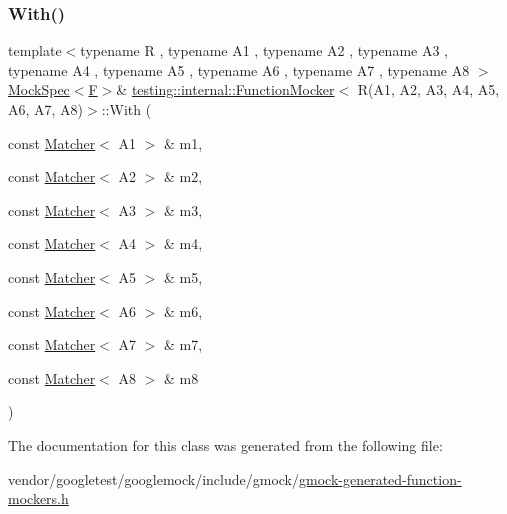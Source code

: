 \subsubsection{\texorpdfstring{With()}{With()}}
{\footnotesize\ttfamily template$<$typename R , typename A1 , typename A2 , typename A3 , typename A4 , typename A5 , typename A6 , typename A7 , typename A8 $>$ \\
\hyperlink{classtesting_1_1internal_1_1_mock_spec}{Mock\+Spec}$<$\hyperlink{classtesting_1_1internal_1_1_function_mocker_3_01_r_07_a1_00_01_a2_00_01_a3_00_01_a4_00_01_a5_00_01_a6_00_01_a7_00_01_a8_08_4_ad9749c93b0a17540778c5fa162a5fe6c}{F}$>$\& \hyperlink{classtesting_1_1internal_1_1_function_mocker}{testing\+::internal\+::\+Function\+Mocker}$<$ R(A1, A2, A3, A4, A5, A6, A7, A8)$>$\+::With (\begin{DoxyParamCaption}\item[{const \hyperlink{classtesting_1_1_matcher}{Matcher}$<$ A1 $>$ \&}]{m1,  }\item[{const \hyperlink{classtesting_1_1_matcher}{Matcher}$<$ A2 $>$ \&}]{m2,  }\item[{const \hyperlink{classtesting_1_1_matcher}{Matcher}$<$ A3 $>$ \&}]{m3,  }\item[{const \hyperlink{classtesting_1_1_matcher}{Matcher}$<$ A4 $>$ \&}]{m4,  }\item[{const \hyperlink{classtesting_1_1_matcher}{Matcher}$<$ A5 $>$ \&}]{m5,  }\item[{const \hyperlink{classtesting_1_1_matcher}{Matcher}$<$ A6 $>$ \&}]{m6,  }\item[{const \hyperlink{classtesting_1_1_matcher}{Matcher}$<$ A7 $>$ \&}]{m7,  }\item[{const \hyperlink{classtesting_1_1_matcher}{Matcher}$<$ A8 $>$ \&}]{m8 }\end{DoxyParamCaption})\hspace{0.3cm}{\ttfamily [inline]}}



The documentation for this class was generated from the following file\+:\begin{DoxyCompactItemize}
\item 
vendor/googletest/googlemock/include/gmock/\hyperlink{gmock-generated-function-mockers_8h}{gmock-\/generated-\/function-\/mockers.\+h}\end{DoxyCompactItemize}
